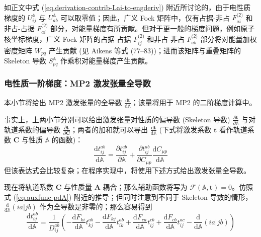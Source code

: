 如正文中式 (\ref{eq.derivation-contrib-Lai-to-engderiv}) 附近所讨论的，由于电性质梯度的 $U_{ij}^\mathbb{A}$ 与 $U_{ab}^\mathbb{A}$ 可以取零值；因此，广义 Fock 矩阵中，仅有占据-非占 $F_{ai}^\textsf{(2)}$ 和非占-占据 $F_{ai}^\textsf{(2)}$ 部分，对能量梯度有所贡献。但对于更一般的梯度问题，例如原子核坐标梯度，广义 Fock 矩阵的占据-占据 $F_{ij}^\textsf{(2)}$ 和非占-非占 $F_{ab}^\textsf{(2)}$ 部分将对能量加权密度矩阵 $W_{pq}$ 产生贡献 (见 Aikens 等式 (77--83)\cite{Aikens-Gordon.TCA.2003})；进而该矩阵与重叠矩阵的 Skeleton 导数 $S_{pq}^\mathbb{A}$ 作乘积对能量梯度产生贡献。

\subsubsection{电性质一阶梯度：MP2 激发张量全导数}
\label{sec.3.amplitude-deriv}

本小节将给出 MP2 激发张量的全导数 $\frac{\mathrm{d} \mathbf{t}}{\mathrm{d} \mathbb{A}}$；该量将用于 MP2 的二阶梯度计算中。

事实上，上两小节分别可以给出激发张量对性质的偏导数 (Skeleton 导数) $\frac{\partial \mathbf{t}}{\partial \mathbb{A}}$ 与对轨道系数的偏导数 $\frac{\partial \mathbf{t}}{\partial \mathbf{C}}$；两者的加和就可以导出 $\frac{\mathrm{d} \mathbf{t}}{\mathrm{d} \mathbb{A}}$ (下式将激发系数 $\mathbf{t}$ 看作轨道系数 $\mathbf{C}$ 与性质 $\mathbb{A}$ 的函数)：
\begin{equation*}
  \frac{\mathrm{d} t_{ij}^{ab}}{\mathrm{d} \mathbb{A}} = \frac{\partial t_{ij}^{ab}}{\partial \mathbb{A}} + \frac{\partial t_{ij}^{ab}}{\partial C_{\mu p}} \frac{\mathrm{d} C_{\mu p}}{\mathrm{d} \mathbb{A}}
\end{equation*}
但该表达式会比较复杂；在程序实现中，将使用下述方式给出激发张量全导数。

现在将轨道系数 $\mathbf{C}$ 与性质量 $\mathbf{A}$ 耦合；那么辅助函数将写为 $\pmb{\mathscr{F}} (\mathbb{A}, \mathbf{t}) = 0$。仿照式 (\ref{eq.auxfunc-pdA}) 附近的推导；但同时注意到不同于 Skeleton 导数的情形，$\frac{\mathrm{d}}{\mathrm{d} \mathbb{A}} (ia|jb)$ 作为全导数是非零的；那么容易得到
\begin{equation}
  \frac{\mathrm{d} t_{ij}^{ab}}{\mathrm{d} \mathbb{A}} = \frac{1}{D_{ij}^{ab}} \left(
    - \frac{\mathrm{d} F_{ki}}{\mathrm{d} \mathbb{A}} t_{kj}^{ab}
    - \frac{\mathrm{d} F_{kj}}{\mathrm{d} \mathbb{A}} t_{ik}^{ab}
    + \frac{\mathrm{d} F_{ca}}{\mathrm{d} \mathbb{A}} t_{ij}^{cb}
    + \frac{\mathrm{d} F_{cb}}{\mathrm{d} \mathbb{A}} t_{ij}^{ac}
    - \frac{\mathrm{d}}{\mathrm{d} \mathbb{A}} (ia|jb)
  \right)
\end{equation}

